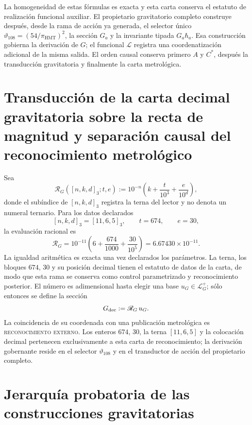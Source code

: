 La homogeneidad de estas fórmulas es exacta y esta carta conserva el estatuto
de realización funcional auxiliar. El propietario gravitatorio completo
construye después, desde la rama de acción ya generada, el selector único
\(\vartheta_{108}=(54/\pi_{\mathrm{HMT}})^2\), la sección \(G_a\) y la
invariante tipada \(G_a\hbar_a\). Esa construcción gobierna la derivación de
\(G\); el funcional \(\mathscr L\) registra una coordenatización adicional de
la misma salida. El orden causal conserva primero \(A\) y \(C^\ast\), después
la transducción gravitatoria y finalmente la carta metrológica.

\section{Transducción de la carta decimal gravitatoria sobre la recta de magnitud y separación causal del reconocimiento metrológico}
\label{sec:lector-decimal-independiente-G}

Sea
\[
 \mathscr R_G([n,k,d]_3;t,e)
 :=10^{-n}\left(k+\frac{t}{10^3}+\frac{e}{10^d}\right),
\]
donde el subíndice de \([n,k,d]_3\) registra la terna del lector y no denota
un numeral ternario. Para los datos declarados
\[
 [n,k,d]_3=[11,6,5]_3,\qquad t=674,\qquad e=30,
\]
la evaluación racional es
\[
 \boxed{
 \mathscr R_G
 =10^{-11}\left(6+\frac{674}{1000}+\frac{30}{10^5}\right)
 =6.67430\times10^{-11}.}
\]
La igualdad aritmética es exacta una vez declarados los parámetros. La terna,
los bloques \(674\), \(30\) y su posición decimal tienen el estatuto de datos
de la carta, de modo que esta rama se conserva como control parametrizado y
reconocimiento posterior. El número es adimensional hasta elegir una base
\(u_G\in\mathcal L_G^+\); sólo entonces se define la sección
\[
 G_{\rm dec}:=\mathscr R_G\,u_G.
\]
La coincidencia de su coordenada con una publicación metrológica es
\textsc{reconocimiento externo}. Los enteros \(674\), \(30\), la terna
\([11,6,5]\) y la colocación decimal pertenecen exclusivamente a esta carta
de reconocimiento; la derivación gobernante reside en el selector
\(\vartheta_{108}\) y en el transductor de acción del propietario completo.

\section{Jerarquía probatoria de las construcciones gravitatorias}
\label{sec:cuadrado-contraste-G}

